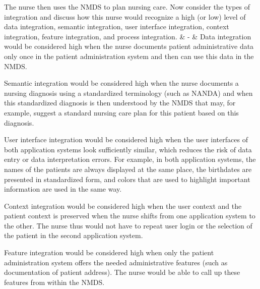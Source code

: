 The nurse then uses the NMDS to plan nursing care.
Now consider the types of integration and discuss how this nurse would recognize a high (or low) level of data integration, semantic integration, user interface integration, context integration, feature integration, and process integration. & - & Data integration would be considered high when the nurse documents patient administrative data only once in the patient administration system and then can use this data in the NMDS.

Semantic integration would be considered high when the nurse documents a nursing diagnosis using a standardized terminology (such as NANDA) and when this standardized diagnosis is then understood by the NMDS that may, for example, suggest a standard nursing care plan for this patient based on this diagnosis.

User interface integration would be considered high when the user interfaces of both application systems look sufficiently similar, which reduces the risk of data entry or data interpretation errors.
For example, in both application systems, the names of the patients are always displayed at the same place, the birthdates are presented in standardized form, and colors that are used to highlight important information are used in the same way.

Context integration would be considered high when the user context and the patient context is preserved when the nurse shifts from one application system to the other.
The nurse thus would not have to repeat user login or the selection of the patient in the second application system.

Feature integration would be considered high when only the patient administration system offers the needed administrative features (such as documentation of patient address). The nurse would be able to call up these features from within the NMDS.

